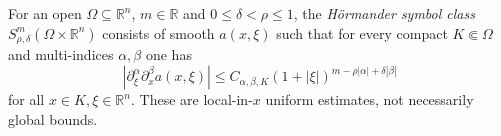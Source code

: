 
For an open $\Omega\subseteq\mathbb R^n$, $m\in\mathbb R$ and $0\le\delta<\rho\le1$, the \emph{Hörmander symbol class} $S^m_{\rho,\delta}(\Omega\times\mathbb R^n)$ consists of smooth $a(x,\xi)$ such that for every compact $K\Subset\Omega$ and multi-indices $\alpha,\beta$ one has
\[
|\partial_\xi^\alpha\partial_x^\beta a(x,\xi)|
\le C_{\alpha,\beta,K}(1+|\xi|)^{m-\rho|\alpha|+\delta|\beta|}
\]
for all $x\in K,\xi\in\mathbb R^n$. These are local-in-$x$ uniform estimates, not necessarily global bounds.
